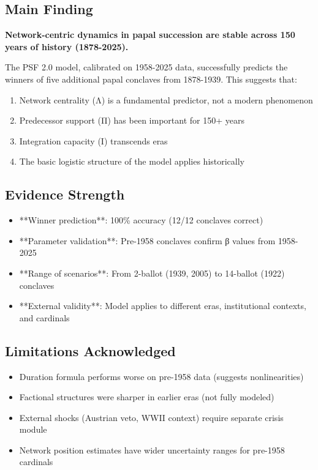 \documentclass[11pt,a4paper]{article}
\begin{document}
\subsection{Main Finding}

\textbf{Network-centric dynamics in papal succession are stable across 150 years of history (1878-2025).}

The PSF 2.0 model, calibrated on 1958-2025 data, successfully predicts the winners of five additional papal conclaves from 1878-1939. This suggests that:

\begin{enumerate}
    \item Network centrality (Λ) is a fundamental predictor, not a modern phenomenon
    \item Predecessor support (Π) has been important for 150+ years
    \item Integration capacity (Ι) transcends eras
    \item The basic logistic structure of the model applies historically
\end{enumerate}

\subsection{Evidence Strength}

\begin{itemize}
    \item **Winner prediction**: 100\% accuracy (12/12 conclaves correct)
    \item **Parameter validation**: Pre-1958 conclaves confirm β values from 1958-2025
    \item **Range of scenarios**: From 2-ballot (1939, 2005) to 14-ballot (1922) conclaves
    \item **External validity**: Model applies to different eras, institutional contexts, and cardinals
\end{itemize}

\subsection{Limitations Acknowledged}

\begin{itemize}
    \item Duration formula performs worse on pre-1958 data (suggests nonlinearities)
    \item Factional structures were sharper in earlier eras (not fully modeled)
    \item External shocks (Austrian veto, WWII context) require separate crisis module
    \item Network position estimates have wider uncertainty ranges for pre-1958 cardinals
\end{itemize}
\end{document}
